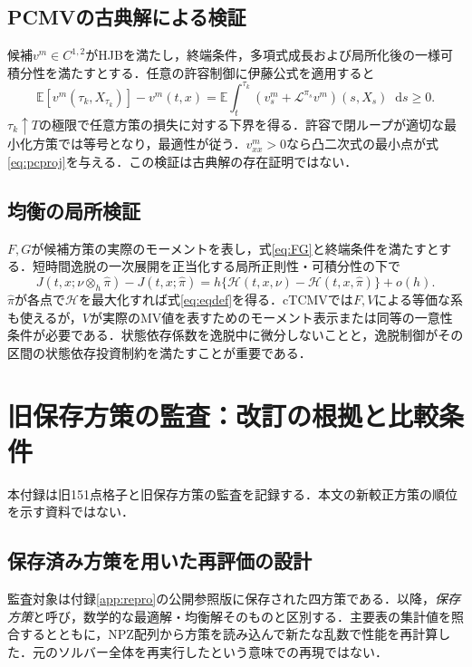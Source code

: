 \documentclass[11pt,a4paper]{article}
\numberwithin{equation}{section}
\numberwithin{table}{section}
\numberwithin{figure}{section}
\theoremstyle{plain}
\theoremstyle{definition}
\newcommand{\E}{\mathbb{E}}
\newcommand{\dd}{\mathop{}\!\mathrm{d}}
\begin{document}
\subsection{PCMVの古典解による検証}
候補$v^m\in C^{1,2}$がHJBを満たし，終端条件，多項式成長および局所化後の一様可積分性を満たすとする．任意の許容制御に伊藤公式を適用すると
\begin{equation}
\E[v^m(\tau_k,X_{\tau_k})]-v^m(t,x)
=\E\int_t^{\tau_k}(v_s^m+\mathcal L^{\pi_s}v^m)(s,X_s)\dd s\geq0.
\end{equation}
$\tau_k\uparrow T$の極限で任意方策の損失に対する下界を得る．許容で閉ループが適切な最小化方策では等号となり，最適性が従う．$v_{xx}^m>0$なら凸二次式の最小点が式\eqref{eq:pcproj}を与える．この検証は古典解の存在証明ではない．

\subsection{均衡の局所検証}
$F,G$が候補方策の実際のモーメントを表し，式\eqref{eq:FG}と終端条件を満たすとする．短時間逸脱の一次展開を正当化する局所正則性・可積分性の下で
\begin{equation}
J(t,x;\nu\otimes_h\hat\pi)-J(t,x;\hat\pi)
=h\{\mathcal H(t,x,\nu)-\mathcal H(t,x,\hat\pi)\}+o(h).
\end{equation}
$\hat\pi$が各点で$\mathcal H$を最大化すれば式\eqref{eq:eqdef}を得る．cTCMVでは$F,V$による等価な系も使えるが，$V$が実際のMV値を表すためのモーメント表示または同等の一意性条件が必要である．状態依存係数を逸脱中に微分しないことと，逸脱制御がその区間の状態依存投資制約を満たすことが重要である．

\FloatBarrier
\section{旧保存方策の監査：改訂の根拠と比較条件}
\label{sec:results}
本付録は旧151点格子と旧保存方策の監査を記録する．本文の新較正方策の順位を示す資料ではない．
\subsection{保存済み方策を用いた再評価の設計}
\label{sec:design}
監査対象は付録\ref{app:repro}の公開参照版に保存された四方策である．以降，\emph{保存方策}と呼び，数学的な最適解・均衡解そのものと区別する．主要表の集計値を照合するとともに，NPZ配列から方策を読み込んで新たな乱数で性能を再計算した．元のソルバー全体を再実行したという意味での再現ではない．
\end{document}
